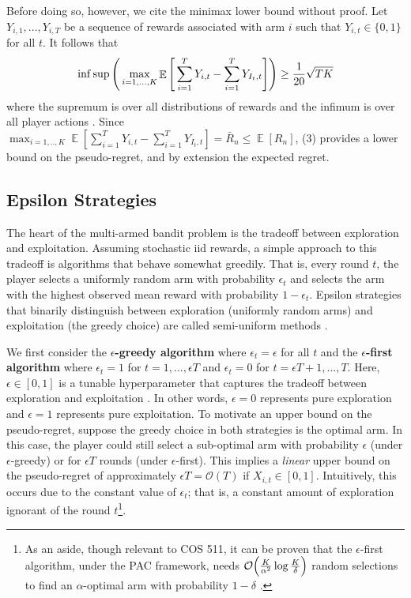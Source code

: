 \documentclass[12pt]{article}
\DeclareMathOperator*{\E}{\mathbb{E}}
\begin{document}
Before doing so, however, we cite the minimax lower bound without proof. Let $Y_{i,1},...,Y_{i,T}$ be a sequence of rewards associated with arm $i$ such that $Y_{i,t}\in\{0,1\}$ for all $t$. It follows that
\begin{align}
\inf\sup\Bigg{(}\max_{i=1,...,K}\E\Bigg{[}\sum_{i=1}^{T}Y_{i,t}-\sum_{i=1}^{T}Y_{I_{t},t}\Bigg{]}\Bigg{)}\geq\frac{1}{20}\sqrt{TK}
\end{align}
where the supremum is over all distributions of rewards and the infimum is over all player actions \cite{bubeck2012}. Since $\max_{i=1,..,K}\E[\sum_{i=1}^{T}Y_{i,t}-\sum_{i=1}^{T}Y_{I_{t},t}]=\bar{R}_{n}\leq\E[R_{n}]$, (3) provides a lower bound on the pseudo-regret, and by extension the expected regret.

\subsection{Epsilon Strategies}

The heart of the multi-armed bandit problem is the tradeoff between exploration and exploitation. Assuming stochastic iid rewards, a simple approach to this tradeoff is algorithms that behave somewhat greedily. That is, every round $t$, the player selects a uniformly random arm with probability $\epsilon_{t}$ and selects the arm with the highest observed mean reward with probability $1-\epsilon_{t}$. Epsilon strategies that binarily distinguish between exploration (uniformly random arms) and exploitation (the greedy choice) are called semi-uniform methods \cite{mohri2005}.

We first consider the \textbf{$\epsilon$-greedy algorithm} where $\epsilon_{t}=\epsilon$ for all $t$ and the \textbf{$\epsilon$-first algorithm} where $\epsilon_{t}=1$ for $t=1,...,\epsilon T$ and $\epsilon_{t}=0$ for $t=\epsilon T+1,...,T$. Here, $\epsilon\in[0,1]$ is a tunable hyperparameter that captures the tradeoff between exploration and exploitation \cite{sutton1998}. In other words, $\epsilon=0$ represents pure exploration and $\epsilon=1$ represents pure exploitation. To motivate an upper bound on the pseudo-regret, suppose the greedy choice in both strategies is the optimal arm. In this case, the player could still select a sub-optimal arm with probability $\epsilon$ (under $\epsilon$-greedy) or for $\epsilon T$ rounds (under $\epsilon$-first). This implies a \textit{linear} upper bound on the pseudo-regret of approximately $\epsilon T=\mathcal{O}(T)$ if $X_{i,t}\in[0,1]$. Intuitively, this occurs due to the constant value of $\epsilon_{t}$; that is, a constant amount of exploration ignorant of the round $t$\footnote{As an aside, though relevant to COS 511, it can be proven that the $\epsilon$-first algorithm, under the PAC framework, needs $\mathcal{O}\Big{(}\frac{K}{\alpha^{2}}\log\frac{K}{\delta}\Big{)}$ random selections to find an $\alpha$-optimal arm with probability $1-\delta$ \cite{evendar2002}.}.
\end{document}
